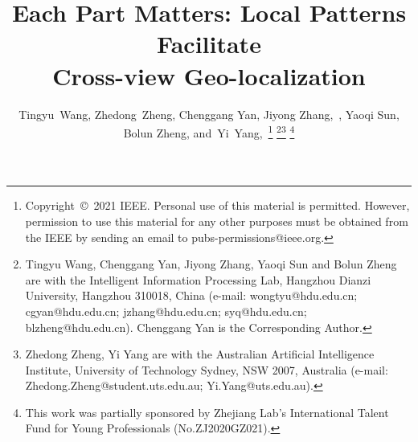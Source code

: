 \documentclass[journal]{IEEEtran}
\begin{document}
\pagestyle{plain}
\title{Each Part Matters: Local Patterns Facilitate \\ Cross-view Geo-localization}


\author{Tingyu~Wang,
        Zhedong~Zheng,
        Chenggang Yan,
        Jiyong Zhang,~,
        Yaoqi Sun,
        Bolun Zheng,
        and~Yi~Yang,~\thanks{Copyright~\copyright~2021 IEEE. Personal use of this material is permitted. However, permission to use this material for any other purposes must be obtained from the IEEE by sending an email to pubs-permissions@ieee.org.}
\thanks{Tingyu Wang, Chenggang Yan, Jiyong Zhang, Yaoqi Sun and Bolun Zheng are with the Intelligent Information Processing Lab, Hangzhou Dianzi University, Hangzhou 310018, China (e-mail: wongtyu@hdu.edu.cn; cgyan@hdu.edu.cn; jzhang@hdu.edu.cn; syq@hdu.edu.cn; blzheng@hdu.edu.cn). Chenggang Yan is the Corresponding Author.}\thanks{Zhedong Zheng, Yi Yang are with the Australian Artificial Intelligence Institute, University of Technology Sydney, NSW 2007, Australia (e-mail: Zhedong.Zheng@student.uts.edu.au; Yi.Yang@uts.edu.au).}
\thanks{This work was partially sponsored by Zhejiang Lab’s International Talent Fund for Young Professionals (No.ZJ2020GZ021).}
}















\newcommand{\zznote}[1]{\textcolor{blue}{ZZ:#1}}
\newcommand{\wtynote}[1]{\textcolor{red}{WTY:#1}}
\maketitle
\end{document}

